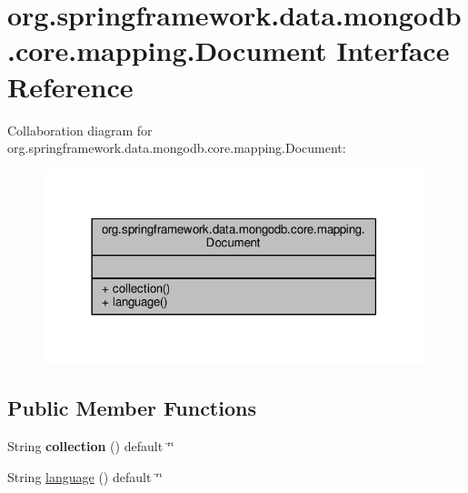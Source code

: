 \hypertarget{interfaceorg_1_1springframework_1_1data_1_1mongodb_1_1core_1_1mapping_1_1Document}{}\section{org.\+springframework.\+data.\+mongodb.\+core.\+mapping.\+Document Interface Reference}
\label{interfaceorg_1_1springframework_1_1data_1_1mongodb_1_1core_1_1mapping_1_1Document}


Collaboration diagram for org.\+springframework.\+data.\+mongodb.\+core.\+mapping.\+Document\+:\nopagebreak
\begin{figure}[H]
\begin{center}
\leavevmode
\includegraphics[width=314pt]{interfaceorg_1_1springframework_1_1data_1_1mongodb_1_1core_1_1mapping_1_1Document__coll__graph}
\end{center}
\end{figure}
\subsection*{Public Member Functions}
\begin{DoxyCompactItemize}
\item 
\mbox{\label{interfaceorg_1_1springframework_1_1data_1_1mongodb_1_1core_1_1mapping_1_1Document_a0d9a144a76f7daac1f5cd54c76d42a6d}} 
String {\bfseries collection} () default \char`\"{}\char`\"{}
\item 
String \hyperlink{interfaceorg_1_1springframework_1_1data_1_1mongodb_1_1core_1_1mapping_1_1Document_ad679d7be1db53bf98c7c412f777a7e3f}{language} () default \char`\"{}\char`\"{}
\end{DoxyCompactItemize}


